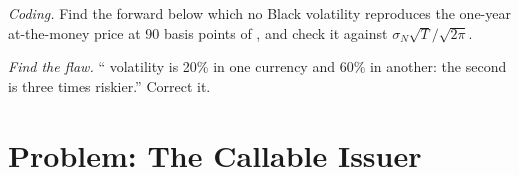 \begin{exercise}[$\star\star\star$]\label{exo:m2:the-rates-options-market:7}
\emph{Coding.} Find the forward below which no Black volatility reproduces the
one-year at-the-money price at 90 basis points of , and check
it against $\sigma_N\sqrt T/\sqrt{2\pi}$.
\end{exercise}

\begin{exercise}[$\star\star\star$]\label{exo:m2:the-rates-options-market:8}
\emph{Find the flaw.} `` volatility is 20\% in one currency and 60\% in
another: the second is three times riskier.'' Correct it.
\end{exercise}

\section{Problem: The Callable Issuer}

